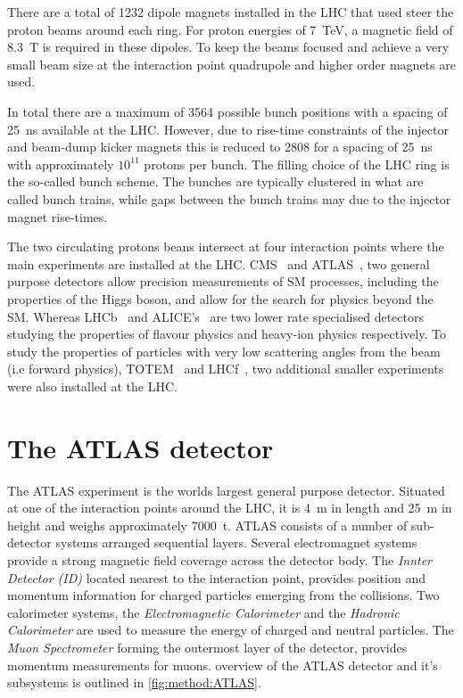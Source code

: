 There are a total of 1232 dipole magnets installed in the LHC that used steer the proton beams 
around each ring. For proton energies of \SI{7}{\tera\eV}, a magnetic field of \SI{8.3}{\tesla} 
is required in these dipoles. To keep the beams focused and achieve a very small beam size at the 
interaction point quadrupole and higher order magnets are used. 

In total there are a maximum of 3564 possible bunch positions with a spacing of \SI{25}{\nano\second} 
available at the LHC. However, due to rise-time constraints of the injector and beam-dump kicker 
magnets this is reduced to 2808 for a spacing of \SI{25}{\nano\second} with approximately $10^{11}$ 
protons per bunch. The filling choice of the LHC ring is the so-called bunch scheme. 
The bunches are typically clustered in what are called bunch trains, while gaps between the bunch 
trains may due to the injector magnet rise-times. 

The two circulating protons beans intersect at four interaction points where the main experiments
are installed at the LHC. CMS~\cite{CMS} and ATLAS~\cite{ATLAS}, two general purpose detectors 
allow precision measurements of SM processes, including the properties of the Higgs boson, and 
allow for the search for physics beyond the SM. Whereas LHCb~\cite{LHCb} and ALICE's~\cite{ALICE} 
are two lower rate specialised detectors studying the properties of flavour physics and heavy-ion 
physics respectively. To study the properties of particles with very low scattering angles from the 
beam (i.e forward physics), TOTEM~\cite{totem:2008zza} and LHCf~\cite{LHCf:2008zz}, two additional smaller experiments were 
also installed at the LHC.

\section{The ATLAS detector}\label{sec:method:ATLAS}

The ATLAS experiment is the worlds largest general purpose detector.  Situated at one of the 
interaction points around the LHC, it is \SI{4}{\meter} in length and \SI{25}{\meter} in height and 
weighs approximately \SI{7000}{\tonne}. ATLAS consists of a number of sub-detector systems arranged 
sequential layers. Several electromagnet systems provide a strong magnetic field coverage across the 
detector body. The \emph{Innter Detector (ID)} located nearest to the interaction point, provides 
position and momentum information for charged particles emerging from the collisions. Two calorimeter
systems, the \emph{Electromagnetic Calorimeter} and the \emph{Hadronic Calorimeter} are used to 
measure the energy of charged and neutral particles. The \emph{Muon Spectrometer} forming the 
outermost layer of the detector, provides momentum measurements for muons. overview of the ATLAS 
detector and it's subsystems is outlined in \cref{fig:method:ATLAS}.

